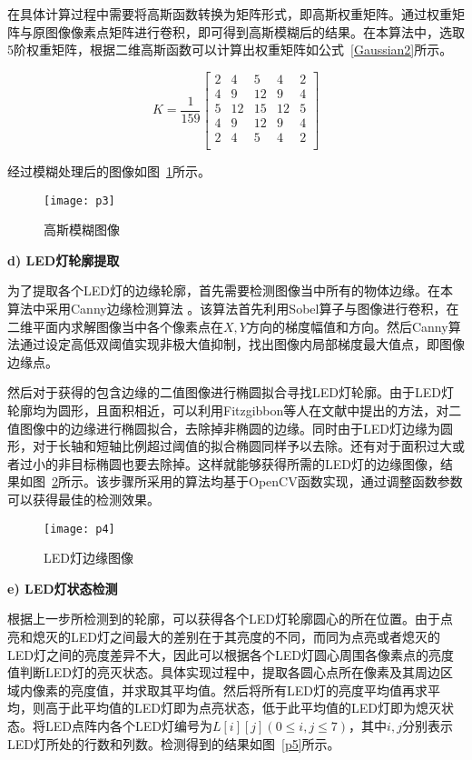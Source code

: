 在具体计算过程中需要将高斯函数转换为矩阵形式，即高斯权重矩阵。通过权重矩阵与原图像像素点矩阵进行卷积，即可得到高斯模糊后的结果。在本算法中，选取5阶权重矩阵，根据二维高斯函数可以计算出权重矩阵如公式~\ref{Gaussian2}所示。

\begin{equation}
K = \frac{1}{159}\left[
\begin{matrix}
2&4&5&4&2 \\
4&9&12&9&4 \\
5&12&15&12&5\\
4&9&12&9&4 \\
2&4&5&4&2 \\
\end{matrix}
\right]
  \label{Gaussian2}
\end{equation}

经过模糊处理后的图像如图~\ref{p3}所示。

\begin{figure}[H] 
  \centering
  \texttt{[image: p3]}
  \caption{高斯模糊图像}
  \label{p3}
\end{figure}

\textbf{d) LED灯轮廓提取}

为了提取各个LED灯的边缘轮廓，首先需要检测图像当中所有的物体边缘。在本算法中采用Canny边缘检测算法 \cite{canny1986computational}。该算法首先利用Sobel算子与图像进行卷积，在二维平面内求解图像当中各个像素点在$X, Y$方向的梯度幅值和方向。然后Canny算法通过设定高低双阈值实现非极大值抑制，找出图像内局部梯度最大值点，即图像边缘点。

然后对于获得的包含边缘的二值图像进行椭圆拟合寻找LED灯轮廓。由于LED灯轮廓均为圆形，且面积相近，可以利用Fitzgibbon等人在文献\cite{fitzgibbon1996buyer}中提出的方法，对二值图像中的边缘进行椭圆拟合，去除掉非椭圆的边缘。同时由于LED灯边缘为圆形，对于长轴和短轴比例超过阈值的拟合椭圆同样予以去除。还有对于面积过大或者过小的非目标椭圆也要去除掉。这样就能够获得所需的LED灯的边缘图像，结果如图~\ref{p4}所示。该步骤所采用的算法均基于OpenCV函数实现，通过调整函数参数可以获得最佳的检测效果。

\begin{figure}[H] 
  \centering
  \texttt{[image: p4]}
  \caption{LED灯边缘图像}
  \label{p4}
\end{figure}

\textbf{e) LED灯状态检测}

根据上一步所检测到的轮廓，可以获得各个LED灯轮廓圆心的所在位置。由于点亮和熄灭的LED灯之间最大的差别在于其亮度的不同，而同为点亮或者熄灭的LED灯之间的亮度差异不大，因此可以根据各个LED灯圆心周围各像素点的亮度值判断LED灯的亮灭状态。具体实现过程中，提取各圆心点所在像素及其周边区域内像素的亮度值，并求取其平均值。然后将所有LED灯的亮度平均值再求平均，则高于此平均值的LED灯即为点亮状态，低于此平均值的LED灯即为熄灭状态。将LED点阵内各个LED灯编号为$L[i][j] (0 \le i, j \le 7)$，其中$i, j$分别表示LED灯所处的行数和列数。检测得到的结果如图~\ref{p5}所示。
 

